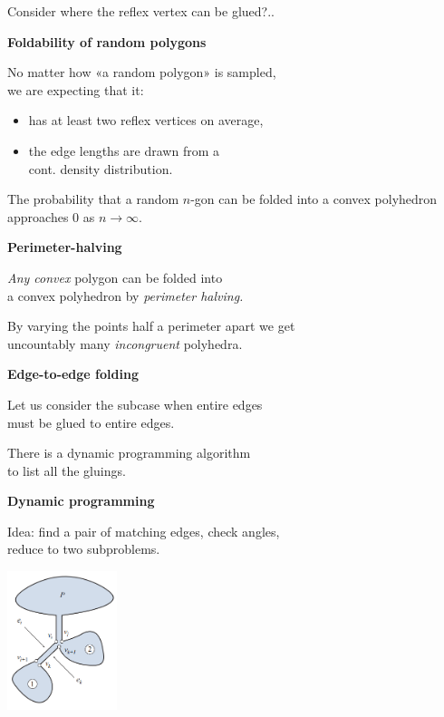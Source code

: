\documentclass[11pt,a4paper]{extarticle}
\begin{document}
Consider where the reflex vertex can be glued?..

{\large \bf Foldability of random polygons}

No matter how «a random polygon» is sampled, \\
we are expecting that it: \vspace{-4mm}

\begin{itemize}
	\item has at least two reflex vertices on average,
	\item the edge lengths are drawn from a \\
	cont. density distribution.
\end{itemize} \vspace{-4mm}

The probability that a random $n$-gon can be folded into a convex polyhedron approaches 0 as \(n \to \infty\).

{\large \bf Perimeter-halving}

{\it Any convex} polygon can be folded into \\
a convex polyhedron by {\it perimeter halving.}

By varying the points half a perimeter apart we get \\
uncountably many {\it incongruent} polyhedra.

{\large \bf Edge-to-edge folding}

Let us consider the subcase when entire edges \\
must be glued to entire edges.

There is a dynamic programming algorithm \\
to list all the gluings.

{\large \bf Dynamic programming}

Idea: find a pair of matching edges, check angles, \\
reduce to two subproblems.

\begin{center}
	\includegraphics[width=3.2cm]{minilec/dynprog}
\end{center}
\end{document}
